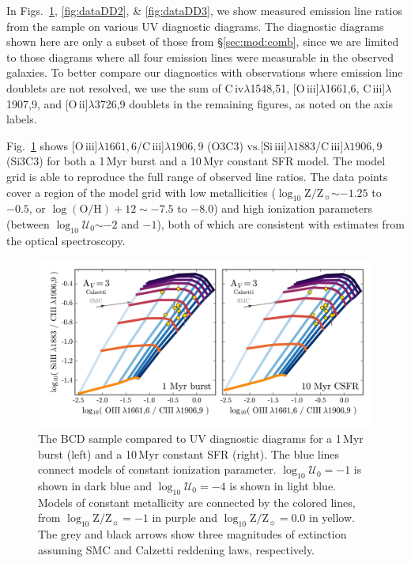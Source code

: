 \documentclass[preprint2,trackchanges]{aastex62}
\newcommand{\oiii}{[O\,{\sc iii}]\xspace}
\newcommand{\oii}{[O\,{\sc ii}]\xspace}
\newcommand{\civ}{C\,{\sc iv}\xspace}
\newcommand{\SiuIII}{[Si\,{\sc iii}]\xspace}
\newcommand{\ciii}{C\,{\sc iii}]\xspace}
\newcommand\vs{\ensuremath{\mathrm{vs.}}\xspace}
\newcommand{\Myr}{$\,$Myr\xspace}
\newcommand{\logten}{\ensuremath{\log_{10}}}
\newcommand{\logz}{\ensuremath{\logten \mathrm{Z}/\mathrm{Z}_{\sun}}\xspace}
\newcommand{\logZeq}[1]{\ensuremath{\logten \mathrm{Z}/\mathrm{Z}_{\sun} = #1}}
\newcommand{\logU}{\ensuremath{\logten \mathcal{U}_0}}
\newcommand{\logUeq}[1]{\ensuremath{\logten \mathcal{U}_0 = #1}}
\begin{document}
In Figs.~\ref{fig:dataDD1}, \ref{fig:dataDD2}, \& \ref{fig:dataDD3}, we show measured emission line ratios from the \citet{Berg+2016} sample on various UV diagnostic diagrams. The diagnostic diagrams shown here are only a subset of those from \S\ref{sec:mod:comb}, since we are limited to those diagrams where all four emission lines were measurable in the observed galaxies. To better compare our diagnostics with observations where emission line doublets are not resolved, we use the sum of \civ$\lambda$1548,51, \oiii$\lambda$1661,6, \ciii$\lambda$1907,9, and \oii$\lambda$3726,9 doublets in the remaining figures, as noted on the axis labels.

Fig.~\ref{fig:dataDD1} shows \oiii$\lambda1661,6$/\ciii$\lambda1906,9$ (O3C3) \vs \SiuIII$\lambda1883$/\ciii$\lambda1906,9$ (Si3C3) for both a 1\Myr burst and a 10\Myr constant SFR model. The model grid is able to reproduce the full range of observed line ratios. The data points cover a region of the model grid with low metallicities (\logz${\sim}-1.25$ to $-0.5$, or $\log( \mathrm{O} / \mathrm{H} ) + 12{\sim}-7.5$ to $-8.0$) and high ionization parameters (between \logU${\sim}-2$ and $-1$), both of which are consistent with estimates from the optical spectroscopy.

\begin{figure}
  \begin{center}
    \includegraphics[width=\linewidth]{figs/f13.png}
    \caption{The \citet{Berg+2016} BCD sample compared to UV diagnostic diagrams for a 1\Myr burst (left) and a 10\Myr constant SFR (right). The blue lines connect models of constant ionization parameter. \logUeq{-1} is shown in dark blue and \logUeq{-4} is shown in light blue. Models of constant metallicity are connected by the colored lines, from \logZeq{-1} in purple and \logZeq{0.0} in yellow. The grey and black arrows show three magnitudes of extinction assuming SMC and Calzetti reddening laws, respectively.}
    \label{fig:dataDD1}
  \end{center}
\end{figure}
\end{document}
